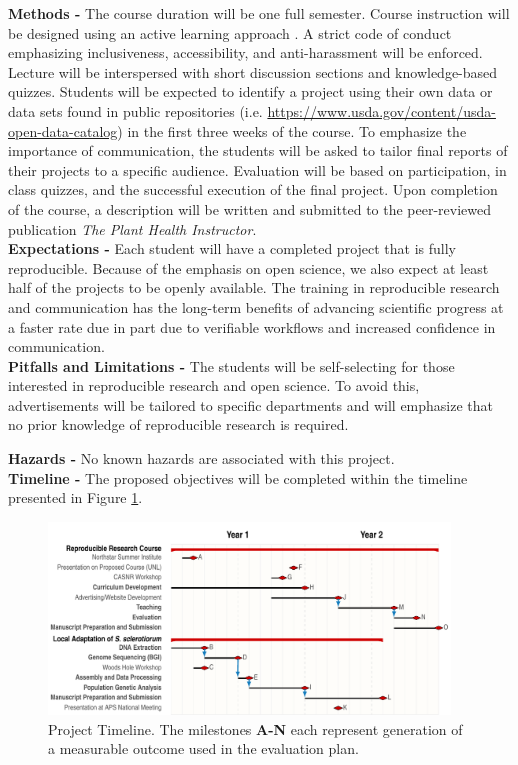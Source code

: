 \documentclass[12pt,letterpaper]{article}
\begin{document}
\noindent \textbf{Methods -}
The course duration will be one full semester. 
Course instruction will be designed using an active learning approach \citep{freeman2014active}.
A strict code of conduct emphasizing inclusiveness, accessibility, and anti-harassment will be enforced.
Lecture will be interspersed with short discussion sections and knowledge-based quizzes.
Students will be expected to identify a project using their own data or data sets found in public repositories (i.e. \url{https://www.usda.gov/content/usda-open-data-catalog}) in the first three weeks of the course.
To emphasize the importance of communication, the students will be asked to tailor final reports of their projects to a specific audience.
Evaluation will be based on participation, in class quizzes, and the successful execution of the final project.
Upon completion of the course, a description will be written and submitted to the peer-reviewed publication \textit{The Plant Health Instructor}.\\
\noindent \textbf{Expectations -}
Each student will have a completed project that is fully reproducible. 
Because of the emphasis on open science, we also expect at least half of the projects to be openly available.
The training in reproducible research and communication has the long-term benefits of advancing scientific progress at a faster rate due in part due to verifiable workflows and increased confidence in communication.\\
\noindent \textbf{Pitfalls and Limitations -}
The students will be self-selecting for those interested in reproducible research and open science.
To avoid this, advertisements will be tailored to specific departments and will emphasize that no prior knowledge of reproducible research is required.

\noindent \textbf{Hazards -} No known hazards are associated with this project.\\
\noindent \textbf{Timeline -} The proposed objectives will be completed within the timeline presented in Figure \ref{fig:timeline}.

\begin{figure}[!htbp]
  \centering
  \includegraphics[width=0.95\textwidth]{packet/timeline.pdf}
  \caption{Project Timeline. The milestones \textbf{A-N} each represent generation of a measurable outcome used in the evaluation plan.}
  \label{fig:timeline}
\end{figure}
\end{document}
